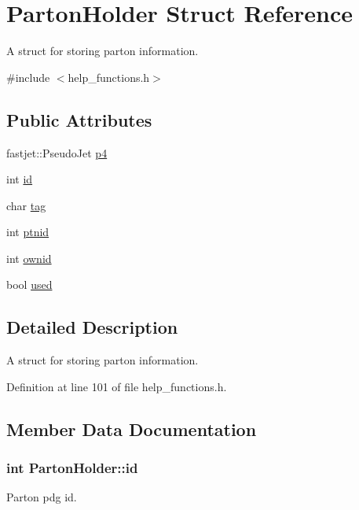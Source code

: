 \hypertarget{struct_parton_holder}{}\section{Parton\+Holder Struct Reference}
\label{struct_parton_holder}


A struct for storing parton information.  




{\ttfamily \#include $<$help\+\_\+functions.\+h$>$}

\subsection*{Public Attributes}
\begin{DoxyCompactItemize}
\item 
fastjet\+::\+Pseudo\+Jet \hyperlink{struct_parton_holder_a1d8d83542f42beaf5defd588825dc454}{p4}
\item 
int \hyperlink{struct_parton_holder_a867f4b0ec369253b284062505adfed3d}{id}
\item 
char \hyperlink{struct_parton_holder_ad824ed477cfc7122a3e494a26c00efbf}{tag}
\item 
int \hyperlink{struct_parton_holder_a30bec5ed9a9b4852156edfaad7e44529}{ptnid}
\item 
int \hyperlink{struct_parton_holder_ada40785510773105d233d9f09efbe7ab}{ownid}
\item 
bool \hyperlink{struct_parton_holder_a551c1f417a4400ec700b91262b31776f}{used}
\end{DoxyCompactItemize}


\subsection{Detailed Description}
A struct for storing parton information. 

Definition at line 101 of file help\+\_\+functions.\+h.



\subsection{Member Data Documentation}
\subsubsection[{\texorpdfstring{id}{id}}]{\setlength{\rightskip}{0pt plus 5cm}int Parton\+Holder\+::id}\hypertarget{struct_parton_holder_a867f4b0ec369253b284062505adfed3d}{}\label{struct_parton_holder_a867f4b0ec369253b284062505adfed3d}
Parton pdg id. 

